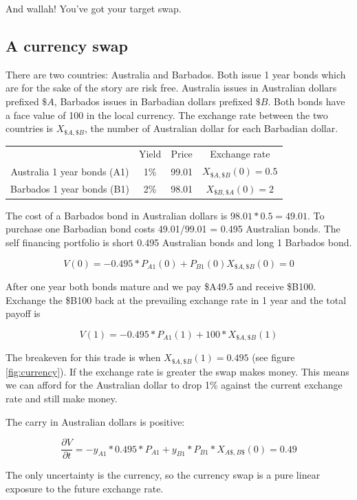And wallah! You've got your target swap. 

\subsection{A currency swap}

There are two countries: Australia and Barbados. Both issue 1 year bonds which are for the sake of the story are risk free. Australia issues in Australian dollars prefixed $\$A$, Barbados issues in Barbadian dollars prefixed $\$B$. Both bonds have a face value of 100 in the local currency. The exchange rate between the two countries is $X_{\$A,\$B}$, the number of Australian dollar for each Barbadian dollar. 

\begin{center}
\begin{tabular}{|c|ccc|}
\hline
 & Yield & Price & Exchange rate\\
 Australia 1 year bonds (A1) & 1\% & 99.01 & $X_{\$A,\$B}(0) = 0.5$\\
 Barbados 1 year bonds (B1) & 2\% &  98.01 &$X_{\$B,\$A}(0) = 2$\\
\hline
\end{tabular}
\end{center}
 
 The cost of a Barbados bond in Australian dollars is $98.01*0.5 = 49.01$. To purchase one Barbadian bond costs 49.01/99.01 = 0.495 Australian bonds. The self financing portfolio is short 0.495 Australian bonds and long 1 Barbados bond.
 
 \[V(0) = -0.495*P_{A1}(0) + P_{B1}(0)X_{\$A,\$B}(0) = 0 \]
 
 After one year both bonds mature and we pay \$A49.5 and receive \$B100. Exchange the \$B100 back at the prevailing exchange rate in 1 year and the total payoff is
 
 \[V(1) = -0.495*P_{A1}(1)+100*X_{\$A,\$B}(1) \]
 
The breakeven for this trade is when $X_{\$A,\$B}(1) = 0.495$ (see figure \ref{fig:currency}). If the exchange rate is greater the swap makes money. This means we can afford for the Australian dollar to drop 1\% against the current exchange rate and still make money. 
 
 The carry in Australian dollars is positive:
 
 \[\frac{\partial V}{\partial t} = -y_{A1}*0.495*P_{A1} + y_{B1}*P_{B1}*X_{A\$,B\$} (0)= 0.49 \]

The only uncertainty is the currency, so the currency swap is a pure linear exposure to the future exchange rate.

